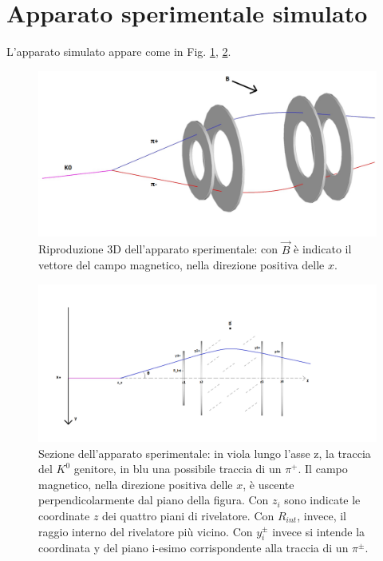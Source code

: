 \documentclass[8pt]{extarticle}
\begin{document}
\section{Apparato sperimentale simulato} \label{sec:apparato}
L'apparato simulato appare come in Fig. \ref{fig:apparato_3d}, \ref{fig:apparato_2d}.


\begin{figure}
	\begin{center}
		\includegraphics[scale=0.4]{apparato_3d} 
		\caption{Riproduzione 3D dell'apparato sperimentale: con $\vec{B}$ è indicato il vettore del campo magnetico, nella direzione positiva delle $x$.}
		\label{fig:apparato_3d}
	\end{center}
\end{figure}

\begin{figure}
	\begin{center}
		\includegraphics[scale=0.4]{apparato_2d}
		\caption{Sezione dell'apparato sperimentale: in viola lungo l'asse z, la traccia del $K^0$ genitore, in blu una possibile traccia di un $\pi^+$. Il campo magnetico, nella direzione positiva delle $x$, è uscente perpendicolarmente dal piano della figura. Con $z_i$ sono indicate le coordinate $z$ dei quattro piani di rivelatore. Con $R_{int}$, invece, il raggio interno del rivelatore più vicino. Con $y_i^{\pm}$ invece si intende la coordinata y del piano i-esimo corrispondente alla traccia di un $\pi^{\pm}$.}
		\label{fig:apparato_2d}
	\end{center}
\end{figure}
\end{document}
